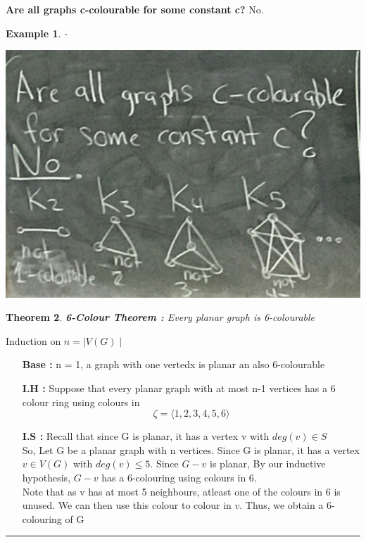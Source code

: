 \documentclass{article}
\newcounter{lecnum}
\newtheorem{theorem}{Theorem}[lecnum]
\newtheorem{ex}[theorem]{Example}
\newenvironment{proof}{{\bf Proof:}}{\hfill\rule{2mm}{2mm}}
\begin{document}
\textbf{Are all graphs c-colourable for some constant c?} No.
\begin{ex}-\\\begin{center}
\includegraphics[scale=0.25]{15}
\end{center}
\end{ex}

\begin{theorem}
\textbf{6-Colour Theorem :} Every planar graph is 6-colourable
\end{theorem}

\begin{proof}
Induction on \(n = \mid V(G) \mid\)
\begin{itemize}
\item[\textbf{Base :}] n = 1, a graph with one vertedx is planar an also 6-colourable 
\item[\textbf{I.H :}] Suppose that every planar graph with at most n-1 vertices has a 6 colour ring using colours in \[\zeta = \langle 1, 2, 3, 4, 5, 6 \rangle \]
\item[\textbf{I.S :}]Recall that since G is planar, it has a vertex v with \(deg(v) \in S \)\\
So, Let G be a planar graph with n vertices. Since  G is planar, it has a vertex \(v \in V(G)\) with \(deg(v) \leq 5\). Since \(G-v\) is planar, By our inductive hypothesis, \(G-v\) has a 6-colouring using colours in 6. \\
Note that as v has at most 5 neighbours, atleast one of the colours in 6 is unused. We can then use this colour to colour in \(v\). Thus, we obtain a 6-colouring of G 
\end{itemize}
\end{proof}
\end{document}
